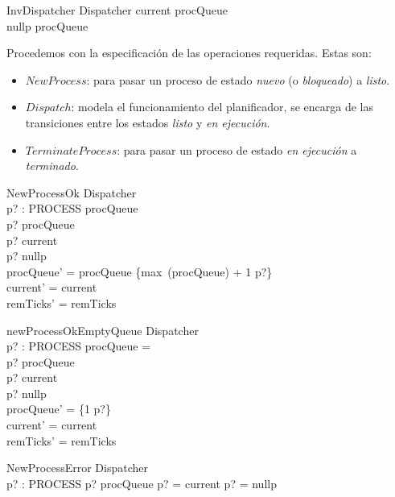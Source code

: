 \documentclass{article}
\begin{document}
\begin{schema}{InvDispatcher}
    Dispatcher
\where
    current \notin \ran procQueue \\
    nullp \notin \ran procQueue
\end{schema}

Procedemos con la especificación de las operaciones requeridas. Estas son:
\begin{itemize}
    \item $NewProcess$: para pasar un proceso de estado \textit{nuevo} (o \textit{bloqueado}) a \textit{listo}.
    \item $Dispatch$: modela el funcionamiento del planificador, se encarga de las transiciones entre los estados \textit{listo} y \textit{en ejecución}.
    \item $TerminateProcess$: para pasar un proceso de estado \textit{en ejecución} a \textit{terminado}.
\end{itemize}

\begin{schema}{NewProcessOk}
    \Delta Dispatcher \\
    p? : PROCESS
\where
    procQueue \neq \emptyset \\
    p? \notin \ran procQueue \\
    p? \neq current \\
    p? \neq nullp \\
    procQueue' = procQueue \cup \{max~(\dom procQueue) + 1 \mapsto p?\} \\
    current' = current \\
    remTicks' = remTicks
\end{schema}

\begin{schema}{newProcessOkEmptyQueue}
    \Delta Dispatcher \\
    p? : PROCESS
\where
    procQueue = \emptyset \\
    p? \notin \ran procQueue \\
    p? \neq current \\
    p? \neq nullp \\
    procQueue' = \{1 \mapsto p?\} \\
    current' = current \\
    remTicks' = remTicks
\end{schema}

\begin{schema}{NewProcessError}
    \Xi Dispatcher \\
    p? : PROCESS
\where
    p? \in \ran procQueue \lor p? = current \lor p? = nullp
\end{schema}
\end{document}
